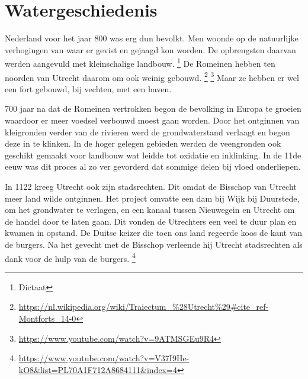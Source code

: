 \section{Watergeschiedenis}

Nederland voor het jaar 800 was erg dun bevolkt.
Men woonde op de natuurlijke verhogingen van waar er gevist en gejaagd kon worden.
De opbrengsten daarvan werden aangevuld met kleinschalige landbouw.
\footnote{Dictaat}
De Romeinen hebben ten noorden van Utrecht daarom om ook weinig gebouwd.
\footnote{\url{https://nl.wikipedia.org/wiki/Traiectum_%28Utrecht%29#cite_ref-Montforts_14-0}}
\footnote{\url{https://www.youtube.com/watch?v=9ATMSGEu9R4}}
Maar ze hebben er wel een fort gebouwd, bij vechten, met een haven.


700 jaar na dat de Romeinen vertrokken begon de bevolking in Europa te groeien waardoor er meer voedsel verbouwd moest gaan worden.
Door het ontginnen van kleigronden verder van de rivieren werd de grondwaterstand verlaagt en begon deze in te klinken.
In de hoger gelegen gebieden werden de veengronden ook geschikt gemaakt voor landbouw wat leidde tot oxidatie en inklinking.
In de 11de eeuw was dit proces al zo ver gevorderd dat sommige delen bij vloed onderliepen.

In 1122 kreeg Utrecht ook zijn stadsrechten.
Dit omdat de Bisschop van Utrecht meer land wilde ontginnen.
Het project omvatte een dam bij Wijk bij Duurstede, om het grondwater te verlagen,
en een kanaal tussen Nieuwegein en Utrecht om de handel door te laten gaan.
Dit vonden de Utrechters een veel te duur plan en kwamen in opstand.
De Duitse keizer die toen ons land regeerde koos de kant van de burgers.
Na het gevecht met de Bisschop verleende hij Utrecht stadsrechten als dank voor de hulp van de burgers.
\footnote{\url{https://www.youtube.com/watch?v=V37I9He-kO8&list=PL70A1F712A8684111&index=4}}

